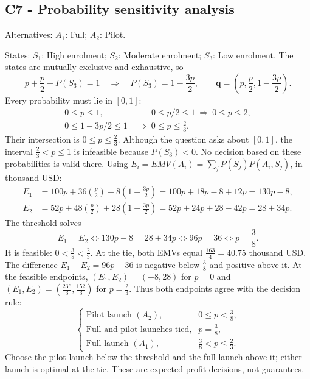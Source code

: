 \subsection*{C7 - Probability sensitivity analysis }
\label{sol:online-course-launch-c7}
Alternatives: $A_1$: Full; $A_2$: Pilot.\par
States: $S_1$: High enrolment; $S_2$: Moderate enrolment; $S_3$: Low enrolment.
The states are mutually exclusive and exhaustive, so
\[
p+\frac p2+P(S_3)=1\quad\Longrightarrow\quad
P(S_3)=1-\frac{3p}{2},\qquad
\boldsymbol{q}=\left(p,\frac p2,1-\frac{3p}{2}\right).
\]
Every probability must lie in $[0,1]$:
\[
\begin{aligned}
0\le p\le1,&\qquad 0\le p/2\le1\ \Longrightarrow\ 0\le p\le2,\\
0\le1-3p/2\le1&\ \Longrightarrow\ 0\le p\le\frac23.
\end{aligned}
\]
Their intersection is $\boxed{0\le p\le\frac23}$.
Although the question asks about $[0,1]$, the interval
$\frac23<p\le1$ is infeasible because $P(S_3)<0$.
No decision based on these probabilities is valid there.
Using $E_i=EMV(A_i)=\sum_j P(S_j)P(A_i,S_j)$, in thousand USD:
\begin{align*}
E_1&=100p+36\left(\frac p2\right)-8\left(1-\frac{3p}{2}\right)
=100p+18p-8+12p=130p-8,\\
E_2&=52p+48\left(\frac p2\right)+28\left(1-\frac{3p}{2}\right)
=52p+24p+28-42p=28+34p.
\end{align*}
The threshold solves
\[
E_1=E_2\iff130p-8=28+34p\iff96p=36
\iff\boxed{p=\frac38}.
\]
It is feasible: $0<\frac38<\frac23$. At the tie, both EMVs equal
$\frac{163}{4}=40.75$ thousand USD.
The difference $E_1-E_2=96p-36$ is negative below $\frac38$ and positive above it.
At the feasible endpoints, $(E_1,E_2)=(-8,28)$ for $p=0$ and
$(E_1,E_2)=(\frac{236}{3},\frac{152}{3})$ for $p=\frac23$.
Thus both endpoints agree with the decision rule:
\[
\boxed{\begin{cases}
\text{Pilot launch }(A_2),&0\le p<\frac38,\\
\text{Full and pilot launches tied},&p=\frac38,\\
\text{Full launch }(A_1),&\frac38<p\le\frac23.
\end{cases}}
\]
Choose the pilot launch below the threshold and the full launch above it;
either launch is optimal at the tie. These are expected-profit decisions, not guarantees.

